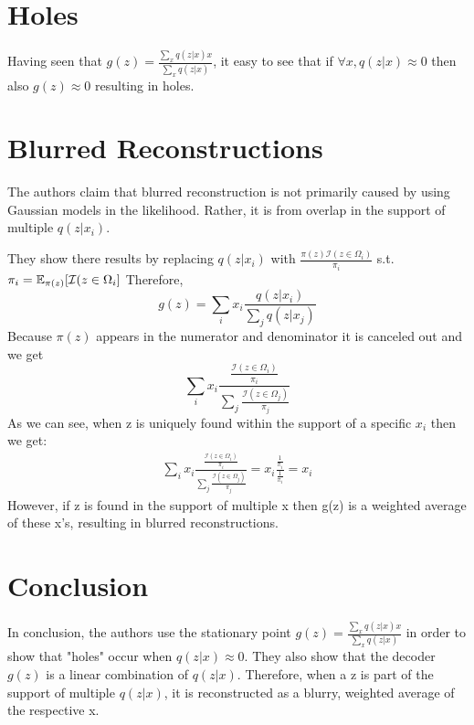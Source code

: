 \section*{Holes}
Having seen that $g(z) = \frac{\sum_{x}{q(z|x) x}}{\sum_{x}{q(z|x)}}$, it easy to see that if $\forall x, q(z|x) \approx 0$ then also $g(z) \approx 0$ resulting in holes.

\section*{Blurred Reconstructions}
The authors claim that blurred reconstruction is not primarily caused by using Gaussian models in the likelihood. Rather, it is from overlap in the support of multiple $q(z|x_{i})$.
\par
They show there results by replacing $q(z|x_{i})$ with $\frac{\pi(z)\mathcal{I}(z\in\Omega_{i})}{\pi_{i}}$ s.t. $\pi_{i} = \operatorname{\mathbb{E}}_{\pi(z)}[\mathcal{I}(z\in\Omega_{i}]$
Therefore,
\setcounter{equation}{0} 
\begin{equation}
g(z) = \sum_{i}x_{i}\frac{q(z|x_{i})}{\sum_{j}q(z|x_{j})}
\end{equation}
Because $\pi(z)$ appears in the numerator and denominator it is canceled out and we get
\begin{equation}
\sum_{i}x_{i}\frac{\frac{\mathcal{I}(z\in\Omega_{i})}{\pi_{i}}}{\sum_{j}\frac{\mathcal{I}(z\in\Omega_{j})}{\pi_{j}}}
\end{equation}
As we can see, when z is uniquely found within the support of a specific $x_i$ then we get:
\begin{gather*}
\sum_{i}x_{i}\frac{\frac{\mathcal{I}(z\in\Omega_{i})}{\pi_{i}}}{\sum_{j}\frac{\mathcal{I}(z\in\Omega_{j})}{\pi_{j}}} = x_{i}\frac{\frac{1}{\pi_{i}}}{\frac{1}{\pi_{i}}} = x_{i}
\end{gather*}
However, if z is found in the support of multiple x then g(z) is a weighted average of these x's, resulting in blurred reconstructions.

\section*{Conclusion}
In conclusion, the authors use the stationary point $g(z) = \frac{\sum_{x}{q(z|x) x}}{\sum_{x}{q(z|x)}}$ in order to show that "holes" occur when $q(z|x) \approx 0$. They also show that the decoder $g(z)$ is a linear combination of $q(z|x)$. Therefore, when a z is part of the support of multiple $q(z|x)$, it is reconstructed as a blurry, weighted average of the respective x.
